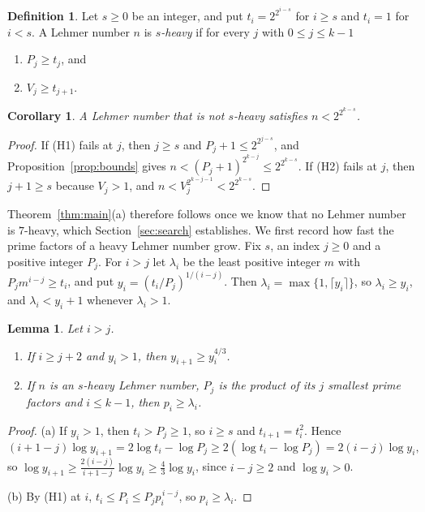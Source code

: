 \documentclass[11pt,reqno]{amsart}
\numberwithin{equation}{section}
\theoremstyle{plain}
\newtheorem{lemma}[theorem]{Lemma}
\newtheorem{corollary}[theorem]{Corollary}
\theoremstyle{definition}
\newtheorem{definition}[theorem]{Definition}
\theoremstyle{remark}
\begin{document}
\begin{definition}\label{def:heavy}
Let $s\ge0$ be an integer, and put $t_i=2^{2^{i-s}}$ for $i\ge s$ and
$t_i=1$ for $i<s$. A Lehmer number $n$ is \emph{$s$-heavy} if for every
$j$ with $0\le j\le k-1$
\begin{enumerate}[label=\textup{(H\arabic*)}]
\item $P_j\ge t_j$, and
\item $V_j\ge t_{j+1}$.
\end{enumerate}
\end{definition}

\begin{corollary}\label{cor:light}
A Lehmer number that is not $s$-heavy satisfies $n<2^{2^{k-s}}$.
\end{corollary}

\begin{proof}
If (H1) fails at $j$, then $j\ge s$ and $P_j+1\le2^{2^{j-s}}$, and
Proposition~\ref{prop:bounds} gives
$n<(P_j+1)^{2^{k-j}}\le2^{2^{k-s}}$. If (H2) fails at $j$, then
$j+1\ge s$ because $V_j>1$, and $n<V_j^{2^{k-j-1}}<2^{2^{k-s}}$.
\end{proof}

Theorem~\ref{thm:main}(a) therefore follows once we know that no
Lehmer number is $7$-heavy, which Section~\ref{sec:search}
establishes. We first record how fast the prime factors of a heavy
Lehmer number grow. Fix $s$, an index $j\ge0$ and a positive integer
$P_j$. For $i>j$ let $\lambda_i$ be the least positive integer $m$
with $P_jm^{i-j}\ge t_i$, and put $y_i=(t_i/P_j)^{1/(i-j)}$. Then
$\lambda_i=\max\{1,\lceil y_i\rceil\}$, so $\lambda_i\ge y_i$, and
$\lambda_i<y_i+1$ whenever $\lambda_i>1$.

\begin{lemma}\label{lem:growth}
Let $i>j$.
\begin{enumerate}[label=\textup{(\alph*)}]
\item If $i\ge j+2$ and $y_i>1$, then $y_{i+1}\ge y_i^{4/3}$.
\item If $n$ is an $s$-heavy Lehmer number, $P_j$ is the product of
its $j$ smallest prime factors and $i\le k-1$, then $p_i\ge\lambda_i$.
\end{enumerate}
\end{lemma}

\begin{proof}
(a) If $y_i>1$, then $t_i>P_j\ge1$, so $i\ge s$ and
$t_{i+1}=t_i^2$. Hence
\[
  (i+1-j)\log y_{i+1}=2\log t_i-\log P_j
  \ge2(\log t_i-\log P_j)=2(i-j)\log y_i ,
\]
so $\log y_{i+1}\ge\frac{2(i-j)}{i+1-j}\log y_i\ge\frac43\log y_i$,
since $i-j\ge2$ and $\log y_i>0$.

(b) By (H1) at $i$, $t_i\le P_i\le P_jp_i^{\,i-j}$, so
$p_i\ge\lambda_i$.
\end{proof}
\end{document}
